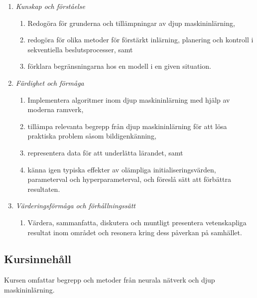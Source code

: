 \begin{enumerate}
\def\labelenumi{\Alph{enumi}.}
\tightlist
\item
  \emph{Kunskap och förståelse}

  \begin{enumerate}
  \def\labelenumii{\Alph{enumi}.\arabic{enumii}.}
  \tightlist
  \item
    Redogöra för grunderna och tillämpningar av djup maskininlärning,
  \item
    redogöra för olika metoder för förstärkt inlärning, planering och
    kontroll i sekventiella beslutsprocesser, samt
  \item
    förklara begränsningarna hos en modell i en given situation.
  \end{enumerate}
\item
  \emph{Färdighet och förmåga}

  \begin{enumerate}
  \def\labelenumii{\Alph{enumi}.\arabic{enumii}.}
  \tightlist
  \item
    Implementera algoritmer inom djup maskininlärning med hjälp av
    moderna ramverk,
  \item
    tillämpa relevanta begrepp från djup maskininlärning för att lösa
    praktiska problem såsom bildigenkänning,
  \item
    representera data för att underlätta lärandet, samt
  \item
    känna igen typiska effekter av olämpliga initialiseringsvärden,
    parameterval och hyperparameterval, och föreslå sätt att förbättra
    resultaten.
  \end{enumerate}
\item
  \emph{Värderingsförmåga och förhållningssätt}

  \begin{enumerate}
  \def\labelenumii{\Alph{enumi}.\arabic{enumii}.}
  \tightlist
  \item
    Värdera, sammanfatta, diskutera och muntligt presentera
    vetenskapliga resultat inom området och resonera kring dess påverkan
    på samhället.
  \end{enumerate}
\end{enumerate}

\subsection*{Kursinnehåll}

Kursen omfattar begrepp och metoder från neurala nätverk och djup
maskininlärning.

